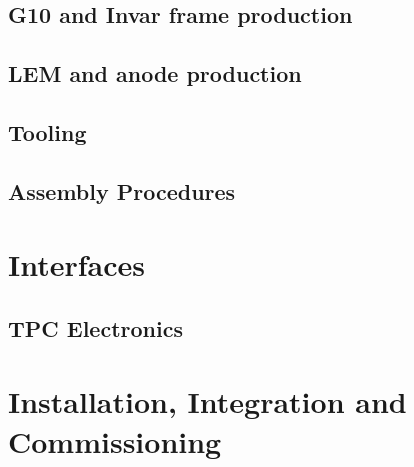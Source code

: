 \subsection{G10 and Invar frame production}
\label{sec:fddp-crp-frame}

\subsection{LEM and anode production}
\label{sec:fddp-crp-LASprod}


\subsection{Tooling}
\label{sec:fddp-crp-tooling}


\subsection{Assembly Procedures}
\label{sec:fddp-crp-assy}



\section{Interfaces}
\label{sec:fddp-crp-intfc}



\subsection{TPC Electronics}
\label{sec:fddp-crp-intfc-elec}


\subsection{}
\label{sec:fddp-crp-intfc-?}


\section{Installation, Integration and Commissioning}
\label{sec:fddp-crp-install}

